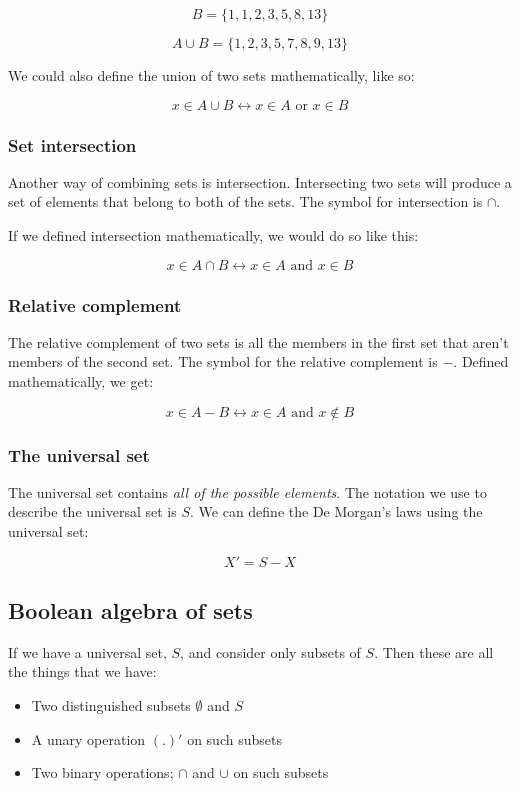 \documentclass{article}
\begin{document}
\[
 	B = \{1, 1, 2, 3, 5, 8, 13\}
\]

\[
	A \cup B = \{1, 2, 3, 5, 7, 8, 9, 13\}
\]

We could also define the union of two sets mathematically, like so:

\[
	x \in A \cup B \leftrightarrow x \in A \textrm{ or } x \in B
\]

\subsubsection{Set intersection}

Another way of combining sets is intersection. Intersecting two sets will
produce a set of elements that belong to both of the sets. The symbol for
intersection is $\cap$.

If we defined intersection mathematically, we would do so like this:

\[
	x \in A \cap B \leftrightarrow x \in A \textrm{ and } x \in B
\]

\subsubsection{Relative complement}

The relative complement of two sets is all the members in the first set that
aren't members of the second set. The symbol for the relative complement is $-$.
Defined mathematically, we get:

\[
	x \in A - B \leftrightarrow x \in A \textrm{ and } x \not\in B
\]

\subsubsection{The universal set}

The universal set contains {\it all of the possible elements}. The notation we use to describe the universal set is $S$. We can define the De Morgan's laws using the universal set:

\[
	X' = S - X
\]

\subsection{Boolean algebra of sets}

If we have a universal set, $S$, and consider only subsets of $S$. Then these
are all the things that we have:

\begin{itemize}
	\item Two distinguished subsets $\emptyset$ and $S$
	\item A unary operation $(.)'$ on such subsets
	\item Two binary operations; $\cap$ and $\cup$ on such subsets
\end{itemize}
\end{document}
